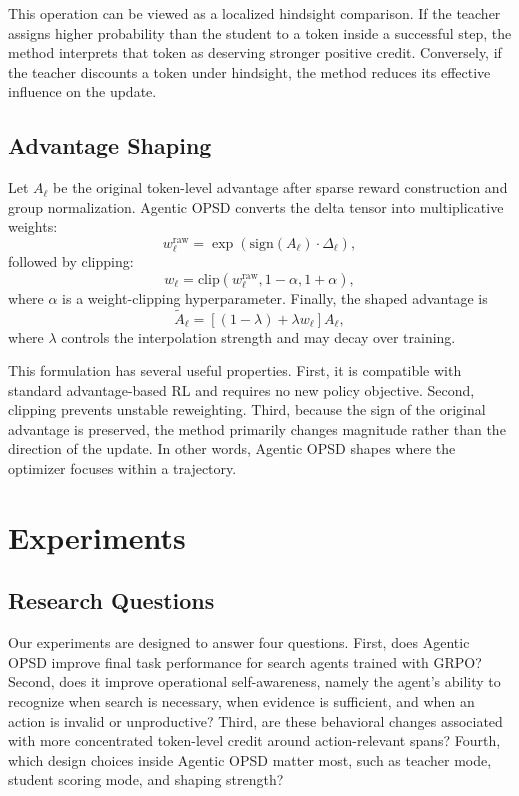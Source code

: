 \documentclass[11pt]{article}
\newcommand{\method}{Agentic OPSD}
\newcommand{\grpo}{GRPO}
\begin{document}
This operation can be viewed as a localized hindsight comparison. If the teacher assigns higher probability than the student to a token inside a successful step, the method interprets that token as deserving stronger positive credit. Conversely, if the teacher discounts a token under hindsight, the method reduces its effective influence on the update.

\subsection{Advantage Shaping}
Let $A_{\ell}$ be the original token-level advantage after sparse reward construction and group normalization. \method{} converts the delta tensor into multiplicative weights:
\begin{equation}
w_{\ell}^{\text{raw}} = \exp(\mathrm{sign}(A_{\ell}) \cdot \Delta_{\ell}),
\end{equation}
followed by clipping:
\begin{equation}
w_{\ell} = \mathrm{clip}(w_{\ell}^{\text{raw}}, 1-\alpha, 1+\alpha),
\end{equation}
where $\alpha$ is a weight-clipping hyperparameter. Finally, the shaped advantage is
\begin{equation}
\tilde{A}_{\ell} = \left[(1-\lambda) + \lambda w_{\ell}\right] A_{\ell},
\end{equation}
where $\lambda$ controls the interpolation strength and may decay over training.

This formulation has several useful properties. First, it is compatible with standard advantage-based RL and requires no new policy objective. Second, clipping prevents unstable reweighting. Third, because the sign of the original advantage is preserved, the method primarily changes magnitude rather than the direction of the update. In other words, \method{} shapes where the optimizer focuses within a trajectory.

\section{Experiments}
\subsection{Research Questions}
Our experiments are designed to answer four questions. First, does \method{} improve final task performance for search agents trained with \grpo{}? Second, does it improve operational self-awareness, namely the agent's ability to recognize when search is necessary, when evidence is sufficient, and when an action is invalid or unproductive? Third, are these behavioral changes associated with more concentrated token-level credit around action-relevant spans? Fourth, which design choices inside Agentic OPSD matter most, such as teacher mode, student scoring mode, and shaping strength?
\end{document}
